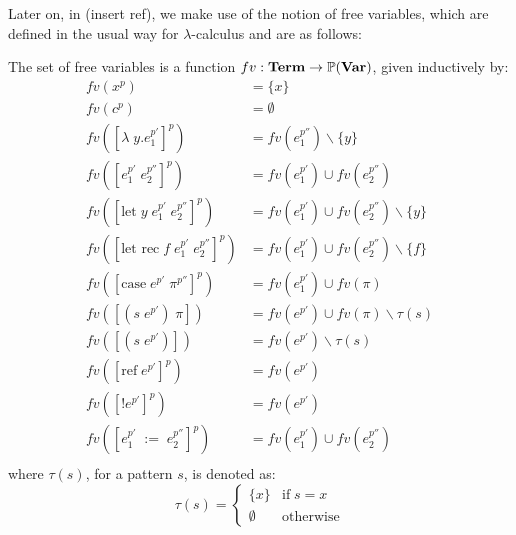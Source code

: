 \documentclass[../../master.tex]{subfiles}
\begin{document}

Later on, in (insert ref), we make use of the notion of free variables, which are defined in the usual way for $\lambda$-calculus and are as follows:
\begin{definition}\label{def:fv}
	The set of free variables is a function $fv:\textbf{Term}\rightarrow\mathbb{P}(\textbf{Var})$, given inductively by:
	\begin{align*}
		fv(x^p)&=\{x\}\\
		fv(c^p)&=\emptyset\\
		fv([\lambda\;y.e_1^{p'}]^p)&=fv(e_1^{p''})\backslash\{y\}\\
		fv([e_1^{p'}\;e_2^{p''}]^p)&=fv(e_1^{p'})\cup fv(e_2^{p''})\\
		fv([\mbox{let}\;y\;e_1^{p'}\;e_2^{p''}]^p)&=fv(e_1^{p'})\cup fv(e_2^{p''})\backslash\{y\}\\
		fv([\mbox{let rec}\;f\;e_1^{p'}\;e_2^{p''}]^p)&=fv(e_1^{p'})\cup fv(e_2^{p''})\backslash\{f\}\\
		fv([\mbox{case}\;e^{p'}\;\pi^{p''}]^p)&=fv(e_1^{p'})\cup fv(\pi)\\
		fv([(s\;e^{p'})\;\pi])&=fv(e^{p'})\cup fv(\pi)\backslash\tau(s)\\
		fv([(s\;e^{p'})])&=fv(e^{p'})\backslash\tau(s)\\
		fv([\mbox{ref}\;e^{p'}]^p)&=fv(e^{p'})\\
		fv([!e^{p'}]^p)&=fv(e^{p'})\\
		fv([e_1^{p'}\;:=\;e_2^{p''}]^p)&=fv(e_1^{p'})\cup fv(e_2^{p''})\\
	\end{align*}
	where $\tau(s)$, for a pattern $s$, is denoted as:
	$$
	\tau(s)=
		\left\{\begin{matrix}
			\{x\} & \mbox{if}\;s=x\\ 
			\emptyset & \mbox{otherwise}
		\end{matrix}\right.
	$$
\end{definition}
\end{document}
